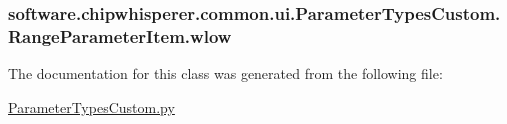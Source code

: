 \subsubsection[{wlow}]{\setlength{\rightskip}{0pt plus 5cm}software.\+chipwhisperer.\+common.\+ui.\+Parameter\+Types\+Custom.\+Range\+Parameter\+Item.\+wlow}\label{classsoftware_1_1chipwhisperer_1_1common_1_1ui_1_1ParameterTypesCustom_1_1RangeParameterItem_ae63aa839574a4cf83faf9335273bded1}


The documentation for this class was generated from the following file\+:\begin{DoxyCompactItemize}
\item 
\hyperlink{ParameterTypesCustom_8py}{Parameter\+Types\+Custom.\+py}\end{DoxyCompactItemize}
